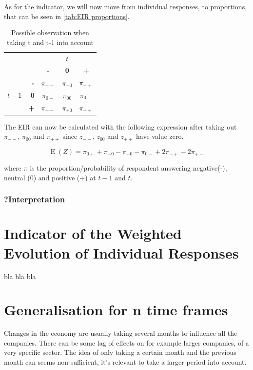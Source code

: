 \documentclass[12pt,a4paper,oneside]{book}
\DeclareMathOperator{\E}{E}
\begin{document}
As for the indicator, we will now move from individual responses, to proportions, that can be seen in \autoref{tab:EIR proportions}.

\begin{table}[H]
    \centering
    \begin{tabular}{r | r | c c c | }
    \multicolumn{1}{r}{} & \multicolumn{1}{r}{} &	\multicolumn{3}{c}{$t$} \\ \cline{3-5}
    \multicolumn{1}{r}{} & 		& \textbf{-} & \textbf{0} & \textbf{+} \\ \cline{2-5}
    		&    \textbf{-} & $\pi_{--}$	& $\pi_{-0}$	& $\pi_{-+}$ \\ 
    $t-1$ & \textbf{0} & $\pi_{0-}$	& $\pi_{00}$	& $\pi_{0+}$	\\
    		&    \textbf{+} & $\pi_{+-}$	& $\pi_{+0}$	& $\pi_{++}$ \\ \cline{2-5}
    \end{tabular}    
    \caption{Possible observation when taking t and t-1 into account}
    \label{tab:EIR proportions}
\end{table}

The EIR can now be calculated with the following expression after taking out $\pi_{--}$, $\pi_{00}$ and $\pi_{++}$ since $z_{--}$, $z_{00}$ and $z_{++}$ have value zero.

\begin{equation}
    \E(Z) = \pi_{0+} + \pi_{-0} - \pi_{+0} - \pi_{0-} +2\pi_{-+} -2\pi_{+-} 
\end{equation}

where $\pi$ is the proportion/probability of respondent answering negative(-), neutral (0) and positive (+) at $t-1$ and $t$. 


\subsubsection{?Interpretation}


\section{Indicator of the Weighted Evolution of Individual Responses}

bla bla bla

\section{Generalisation for n time frames}

Changes in the economy are usually taking several months to influence all the companies. There can be some lag of effects on for example larger companies, of a very specific sector.
The idea of only taking a certain month and the previous month can seems non-sufficient, it's relevant to take a larger period into account. 
\end{document}

